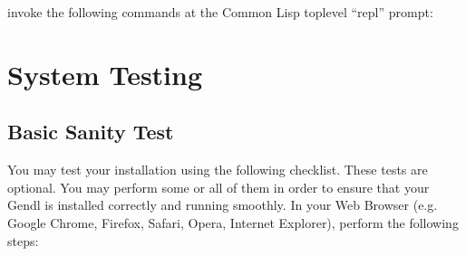 \documentclass [11pt]{book}
\begin{document}
\label{subsec:loadandstartgendl}

invoke the following commands at the Common Lisp toplevel ``repl'' prompt:

\section{System Testing}

\label{sec:systemtesting}



\subsection{Basic Sanity Test}

\label{subsec:basicsanitytest}

You may test your installation using the following
checklist. These tests are optional. You may perform some or all of
them in order to ensure that your Gendl is installed correctly and
running smoothly. In your Web Browser (e.g. Google Chrome, Firefox,
Safari, Opera, Internet Explorer), perform the following steps:
\end{document}
